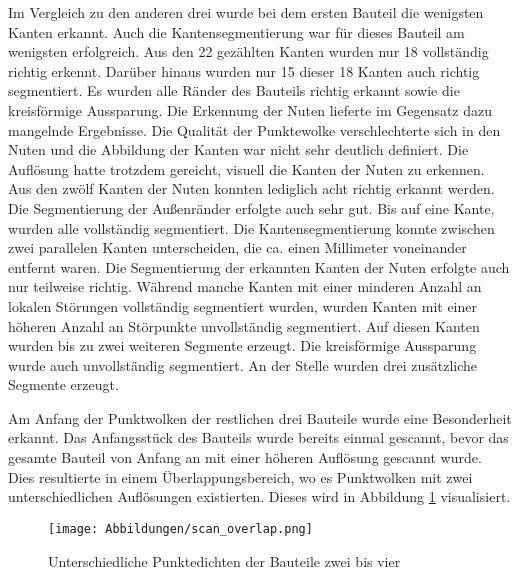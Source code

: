 Im Vergleich zu den anderen drei wurde bei dem ersten Bauteil die wenigsten Kanten erkannt. Auch die Kantensegmentierung war für dieses Bauteil am wenigsten erfolgreich. Aus den 22 gezählten Kanten wurden nur 18 vollständig richtig erkennt. Darüber hinaus wurden nur 15 dieser 18 Kanten auch richtig segmentiert. Es wurden alle Ränder des Bauteils richtig erkannt sowie die kreisförmige Aussparung. Die Erkennung der Nuten lieferte im Gegensatz dazu mangelnde Ergebnisse. Die Qualität der Punktewolke verschlechterte sich in den Nuten und die Abbildung der Kanten war nicht sehr deutlich definiert. Die Auflösung hatte trotzdem gereicht, visuell die Kanten der Nuten zu erkennen. Aus den zwölf Kanten der Nuten konnten lediglich acht richtig erkannt werden. Die Segmentierung der Außenränder erfolgte auch sehr gut. Bis auf eine Kante, wurden alle vollständig segmentiert. Die Kantensegmentierung konnte zwischen zwei parallelen Kanten unterscheiden, die ca. einen Millimeter voneinander entfernt waren. Die Segmentierung der erkannten Kanten der Nuten erfolgte auch nur teilweise richtig. Während manche Kanten mit einer minderen Anzahl an lokalen Störungen vollständig segmentiert wurden, wurden Kanten mit einer höheren Anzahl an Störpunkte unvollständig segmentiert. Auf diesen Kanten wurden bis zu zwei weiteren Segmente erzeugt. Die kreisförmige Aussparung wurde auch unvollständig segmentiert. An der Stelle wurden drei zusätzliche Segmente erzeugt. 

Am Anfang der Punktwolken der restlichen drei Bauteile wurde eine Besonderheit erkannt. Das Anfangsstück des Bauteils wurde bereits einmal gescannt, bevor das gesamte Bauteil von Anfang an mit einer höheren Auflösung gescannt wurde. Dies resultierte in einem Überlappungsbereich, wo es Punktwolken mit zwei unterschiedlichen Auflösungen existierten. Dieses wird in Abbildung \ref{fig: scan_overlap} visualisiert.

\begin{figure}[h]
	\texttt{[image: Abbildungen/scan\_overlap.png]}
	\centering
	\caption{Unterschiedliche Punktedichten der Bauteile zwei bis vier}
	\label{fig: scan_overlap}
\end{figure}

